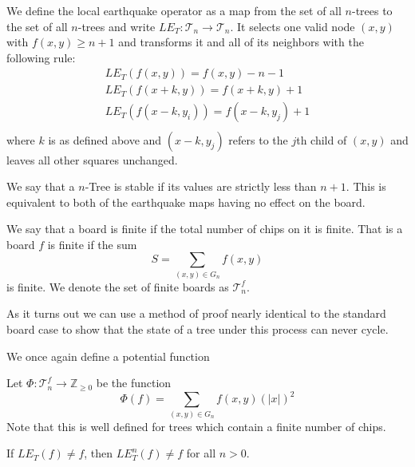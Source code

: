 \documentclass[runningheads,a4paper]{llncs}
\begin{document}
\begin{definition}
 We define the local earthquake operator as a map from the set of all $n$-trees to the set of all $n$-trees and write $LE_T: \mathcal{T}_n \rightarrow \mathcal{T}_n$.
It selects one valid node $(x,y)$ with $f(x,y) \geq n+1$ and transforms it and all of its neighbors with the following rule: 
\begin{align*}
LE_T( f( x, y ) ) = f( x , y )-n-1 \\
LE_T( f( x + k, y)) = f( x + k, y )+1 \\
LE_T( f(x-k, y_i) ) = f(x-k, y_j )+1 \\
\end{align*}
where $k$ is as defined above and $(x-k, y_j)$ refers to the $j$th child of $(x,y)$
and leaves all other squares unchanged.
\end{definition}

\begin{definition}
We say that a $n$-Tree is stable if its values are strictly less than $n+1$. This is equivalent to both of the earthquake maps having no effect on the board. 
\end{definition}

\begin{definition} 
We say that a board is finite if the total number of chips on it is finite. That is a board $f$ is finite if the sum
\begin{equation}
S= \sum_{(x,y) \in G_n} f(x,y) 
\end{equation}
is finite. 
We denote the set of finite boards as $\mathcal{T}_n^f$.
\end{definition}

As it turns out we can use a  method of proof nearly identical to the standard board case to show that the state of a tree under this process can never cycle.

We once again define a potential function 
\begin{definition} Let $\Phi: \mathcal{T}_n^f \rightarrow \mathbb{Z}_{\geq 0}$ be the  function
\begin{equation}
\Phi(f) = \sum_{(x,y) \in G_n} f(x,y)(|x|)^2
\end{equation}
Note that this is well defined for trees which contain a finite number of chips. 
\end{definition} 

\begin{lemma}
If $LE_T(f) \neq f$, then $LE_T^n(f) \neq f$ for all $n > 0$.
\end{lemma}
\end{document}
